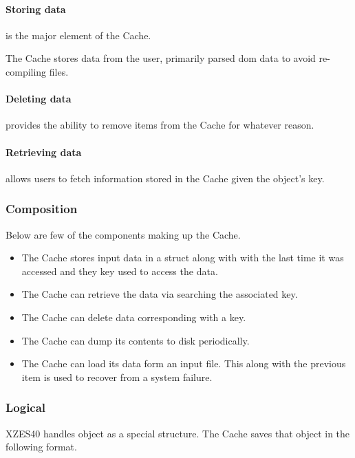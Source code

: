 \begin{enmerate}
\paragraph{Storing data} is the major element of the Cache.

The Cache stores data from the user, primarily parsed \gls{dom} data to avoid re-compiling files.

\paragraph{Deleting data} provides the ability to remove items from the Cache for whatever reason.

\paragraph{Retrieving data} allows users to fetch information stored in the Cache given the object's key.

\subsubsection{Composition}

Below are few of the components making up the Cache.

\begin{itemize}
    \item The Cache stores input data in a \gls{struct} along with with the last time it was accessed and they key used to access the data.
    \item The Cache can retrieve the data via searching the associated key.
    \item The Cache can delete data corresponding with a key.
    \item The Cache can dump its contents to disk periodically.
    \item {
      The Cache can load its data form an input file.
      This along with the previous item is used to recover from a system failure.
    }
\end{itemize}

\subsubsection{Logical}

XZES40 handles object as a special structure.
The Cache saves that object in the following format.


\end{enmerate}
